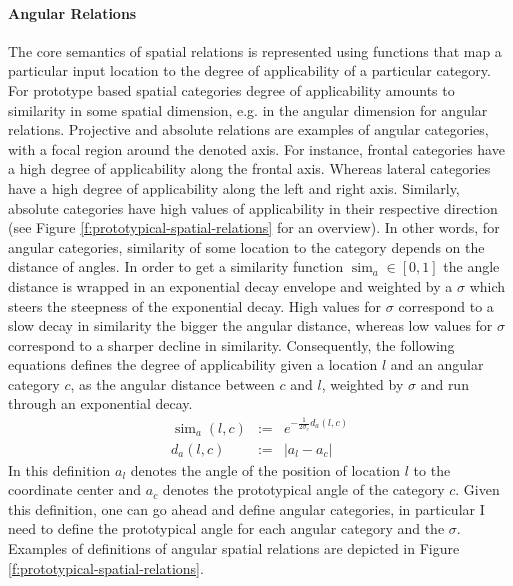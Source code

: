 \paragraph*{Angular Relations} 
The core semantics of spatial relations is represented
using functions that map a particular input location to the degree of applicability
of a particular category. For prototype based spatial categories 
degree of applicability amounts to similarity in some spatial dimension, 
e.g. in the angular dimension for angular relations. 
Projective and absolute relations are 
examples of angular categories, with a focal region around the 
denoted axis. For instance, frontal categories have a high degree of applicability
along the frontal axis. Whereas lateral categories have a high 
degree of applicability along the left and right axis. Similarly, 
absolute categories have high values of applicability
in their respective direction (see Figure \ref{f:prototypical-spatial-relations} 
for an overview). In other words, for angular categories, 
similarity of some location to the category depends on the distance
of angles. In order to get a similarity function $\operatorname{sim}_{a} \in [0,1]$
the angle distance is wrapped in an exponential decay envelope 
and weighted by a $\sigma$ which steers the steepness of the 
exponential decay. High values for $\sigma$ correspond to a slow decay 
in similarity the bigger the angular distance, whereas low values for $\sigma$ 
correspond to a sharper decline in similarity.
Consequently, the following equations defines the degree of applicability given a
location $l$ and an angular category $c$, as the angular distance 
between $c$ and $l$, weighted by $\sigma$ and run through an exponential
decay.
\begin{eqnarray}
\label{e:angular-category-similarity}
\operatorname{sim}_{a}(l,c)&:=&e^{-\frac{1}{2 \sigma_c} d_a(l,c)}\\
\label{e:angular-distance}
d_a(l,c)&:=&|a_l - a_c|
\end{eqnarray}
In this definition $a_l$ denotes the angle of the position of location $l$ 
to the coordinate center and $a_c$ denotes the prototypical angle of the 
category $c$. Given this definition, one can go ahead and define 
angular categories, in particular I need to define the prototypical
angle for each angular category and the $\sigma$. 
Examples of definitions of angular spatial relations are 
depicted in Figure \ref{f:prototypical-spatial-relations}. 



